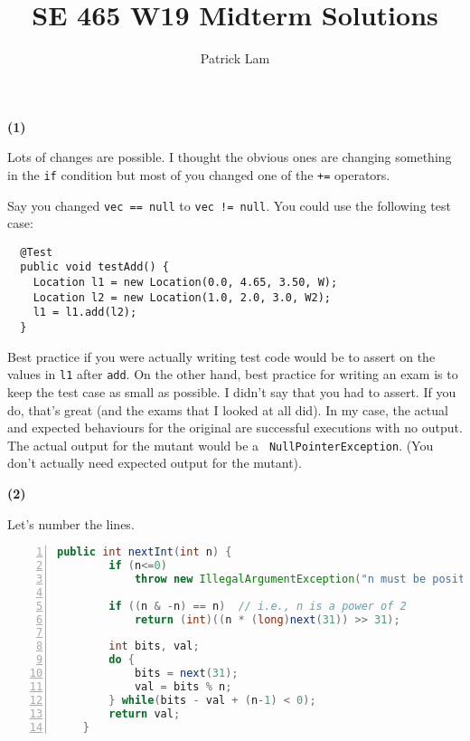 \documentclass[11pt,onecolumn,letterpaper]{article}
\title{SE 465 W19 Midterm Solutions}
\author{Patrick Lam}
\newcounter{qNum}
\newcommand{\q}[1]{%
\textbf{(#1)}\stepcounter{qNum}}
\begin{document}
\vspace{-12em}

\maketitle

\q{1}

Lots of changes are possible. I thought the obvious ones are changing
something in the {\tt if} condition but most of you changed one of the
{\tt +=} operators.

Say you changed {\tt vec == null} to {\tt vec != null}. You could use
the following test case:

\begin{lstlisting}
  @Test
  public void testAdd() {
    Location l1 = new Location(0.0, 4.65, 3.50, W);
    Location l2 = new Location(1.0, 2.0, 3.0, W2);
    l1 = l1.add(l2);
  }
\end{lstlisting}

Best practice if you were actually writing test code would be to
assert on the values in {\tt l1} after {\tt add}. On the other hand,
best practice for writing an exam is to keep the test case as small as
possible. I didn't say that you had to assert. If you do, that's great
(and the exams that I looked at all did). In my case, the actual and
expected behaviours for the original are successful executions with no
output. The actual output for the mutant would be a {\tt
  NullPointerException}. (You don't actually need expected output for
the mutant).

\newpage
\q{2}

Let's number the lines.

\begin{lstlisting}[language=Java,numbers=left]
    public int nextInt(int n) {
        if (n<=0)
            throw new IllegalArgumentException("n must be positive");

        if ((n & -n) == n)  // i.e., n is a power of 2
            return (int)((n * (long)next(31)) >> 31);

        int bits, val;
        do {
            bits = next(31);
            val = bits % n;
        } while(bits - val + (n-1) < 0);
        return val;
    }
\end{lstlisting}
\end{document}
